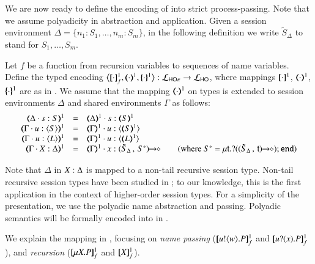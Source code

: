 We are now ready to define the encoding of \HOp into strict process-passing.
Note that we assume polyadicity in abstraction and application.
Given a session environment $\Delta = \{n_1:S_1, \ldots, n_m:S_m\}$, 
in the following definition we write
$\tilde{S}_{\Delta}$ to stand for $S_1, \ldots, S_m$.
%
\begin{definition}\myrm
	\label{def:enc:HOp_to_HO}
	Let $f$ be a function from recursion variables to sequences of name variables.
	Define the typed encoding $\enco{\pmapp{\cdot}{1}{f}, \tmap{\cdot}{1}, \mapa{\cdot}^{1}}: \tyl{L}_{\HOp} \to \tyl{L}_{\HO}$,
	where mappings $[\!\![\cdot]\!\!]^{1}$, $(\!\!\langle\cdot\rangle\!\!)^{1}$, $\{\!\!\{\cdot\}\!\!\}^{1}$
	are as in .
	We assume that the mapping $(\!\!\langle\cdot\rangle\!\!)^{1}$ on types is extended to 
	session environments $\Delta$
	and
	shared environments $\Gamma$ 
	as follows:
%
	\[
	\begin{array}{rcll}
	    \mapt{\Delta \cat s: S}^{1} & =  & \mapt{\Delta}^{1} \cat s:\mapt{S}^{1} & \\
		\tmap{\Gamma \cat u: \chtype{S}}{1} & =  & \tmap{\Gamma}{1} \cat u:\chtype{\tmap{S}{1}} & \\
		\tmap{\Gamma \cat u: \chtype{L}}{1} & = &  \tmap{\Gamma}{1} \cat u:\chtype{\tmap{L}{1}} & \\
		\tmap{\Gamma \cat \varp{X}:\Delta}{1} & = & \tmap{\Gamma}{1} \cat x:\shot{(\tilde{S}_{\Delta}\,,\,S^*)} & 
		\quad\text{(where $ 
		S^* = \trec{t}{\btinp{\shot{(\tilde{S}_{\Delta}\,,\,\vart{t})}} \tinact}$)}
	\end{array}
	\]
\end{definition}



\noi Note that $\Delta$ in $X:\Delta$ is mapped to a non-tail
recursive session type.
Non-tail
recursive session types have been studied in
\cite{DBLP:journals/corr/abs-1202-2086,TGC14};
to our knowledge,
this is the first application in the
context of higher-order session types.
For a simplicity of the presentation, we use the polyadic name abstraction and passing.
Polyadic semantics will be formally encoded into \HO in .

\noi We explain the mapping in , focusing 
on {\em name passing} ($[\!\![u ! \langle w \rangle . P]\!\!]^{1}_{f}$ and $[\!\![u ? (x) . P]\!\!]^{1}_{f}$), and  
{\em recursion} ($[\!\![\mu X. P]\!\!]^{1}_{f}$ and $[\!\![X]\!\!]^{1}_{f}$). 

